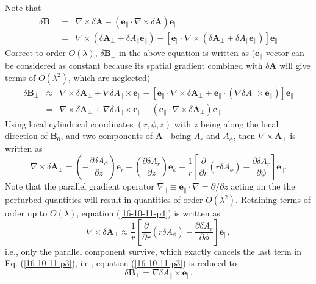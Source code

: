 \documentclass{llncs}
\begin{document}
Note that
\begin{eqnarray}
  \delta \mathbf{B}_{\perp} & = & \nabla \times \delta \mathbf{A}-
  (\mathbf{e}_{\parallel} \cdot \nabla \times \delta \mathbf{A})
  \mathbf{e}_{\parallel} \nonumber\\
  & = & \nabla \times (\delta \mathbf{A}_{\perp} + \delta A_{\parallel}
  \mathbf{e}_{\parallel}) - [\mathbf{e}_{\parallel} \cdot \nabla \times
  (\delta \mathbf{A}_{\perp} + \delta A_{\parallel} \mathbf{e}_{\parallel})]
  \mathbf{e}_{\parallel} 
\end{eqnarray}
Correct to order $O (\lambda)$, $\delta \mathbf{B}_{\perp}$ in the above
equation is written as ($\mathbf{e}_{\parallel}$ vector can be considered as
constant because its spatial gradient combined with $\delta \mathbf{A}$ will
give terms of $O (\lambda^2)$, which are neglected)
\begin{eqnarray}
  \delta \mathbf{B}_{\perp} & \approx & \nabla \times \delta
  \mathbf{A}_{\perp} + \nabla \delta A_{\parallel} \times
  \mathbf{e}_{\parallel} - [\mathbf{e}_{\parallel} \cdot \nabla \times \delta
  \mathbf{A}_{\perp} +\mathbf{e}_{\parallel} \cdot (\nabla \delta
  A_{\parallel} \times \mathbf{e}_{\parallel})] \mathbf{e}_{\parallel} \\
  & = & \nabla \times \delta \mathbf{A}_{\perp} + \nabla \delta A_{\parallel}
  \times \mathbf{e}_{\parallel} - (\mathbf{e}_{\parallel} \cdot \nabla \times
  \delta \mathbf{A}_{\perp}) \mathbf{e}_{\parallel}  \label{16-10-11-p3}
\end{eqnarray}
Using local cylindrical coordinates $(r, \phi, z)$ with $z$ being along the
local direction of $\mathbf{B}_0$, and two components of $\mathbf{A}_{\perp}$
being $A_r$ and $A_{\phi}$, then $\nabla \times \mathbf{A}_{\perp}$ is written
as
\begin{equation}
  \label{16-10-11-p4} \nabla \times \delta \mathbf{A}_{\perp} = \left( -
  \frac{\partial \delta A_{\phi}}{\partial z} \right) \mathbf{e}_r + \left( 
  \frac{\partial \delta A_r}{\partial z} \right) \mathbf{e}_{\phi} +
  \frac{1}{r} \left[  \frac{\partial}{\partial r} (r \delta A_{\phi}) -
  \frac{\partial \delta A_r}{\partial \phi} \right] \mathbf{e}_{\parallel} .
\end{equation}
Note that the parallel gradient operator $\nabla_{\parallel} \equiv
\mathbf{e}_{\parallel} \cdot \nabla = \partial / \partial z$ acting on the the
perturbed quantities will result in quantities of order $O (\lambda^2)$.
Retaining terms of order up to $O (\lambda)$, equation (\ref{16-10-11-p4}) is
written as
\begin{equation}
  \nabla \times \delta \mathbf{A}_{\perp} \approx \frac{1}{r} \left[ 
  \frac{\partial}{\partial r} (r \delta A_{\phi}) - \frac{\partial \delta
  A_r}{\partial \phi} \right] \mathbf{e}_{\parallel},
\end{equation}
i.e., only the parallel component survive, which exactly cancels the last term
in Eq. (\ref{16-10-11-p3}), i.e., equation (\ref{16-10-11-p3}) is reduced to
\begin{equation}
  \label{16-10-11-p7} \delta \mathbf{B}_{\perp} = \nabla \delta A_{\parallel}
  \times \mathbf{e}_{\parallel} .
\end{equation}
\end{document}
